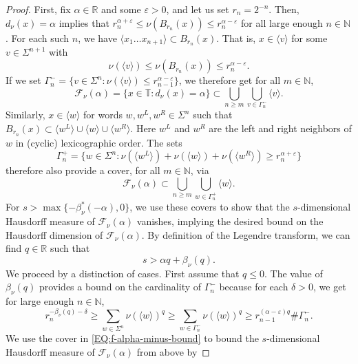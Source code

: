 \documentclass[11pt,reqno]{amsart}
\theoremstyle{plain}
\theoremstyle{definition}
\newcommand{\R}{{\mathbb R}}
\newcommand{\N}{{\mathbb N}}
\newcommand{\mc}{\mathcal}
\begin{document}
\begin{proof}
First, fix $\alpha \in \R$ and some $\varepsilon > 0$, and let us set $r_n = 2^{-n}$. Then, $d_{\nu}(x) = \alpha$ implies that $r_n^{\alpha + \varepsilon}\leqslant \nu(B_{r_n}(x)) \leqslant r_n^{\alpha - \varepsilon}$ for all large enough $n \in \N$. For each such $n$, we have $\langle x_1 \ldots x_{n+1}\rangle \subset B_{r_n}(x)$. That is, $x \in \langle v \rangle$ for some $v \in \Sigma^{n+1}$ with
\[
\nu(\langle v \rangle) \leqslant  \nu(B_{r_n}(x)) \leqslant r_n^{\alpha - \varepsilon}.
\]
If we set $\Gamma_n^{-} = \{ v \in \Sigma^n : \nu(\langle v \rangle) \leqslant r_{n-1}^{\alpha - \varepsilon}  \}$, we therefore get for all $m \in \N$,
\begin{equation}
\label{EQ:f-alpha-minus-bound}
\mc F_{\nu}(\alpha) = \{ x \in \mathbb{T}: d_\nu(x) = \alpha \} \subset \bigcup_{n \geqslant m} \bigcup_{v \in \Gamma_n^{-}} \langle v \rangle.
\end{equation}
Similarly, $x \in \langle w \rangle$ for words $w,w^{L},w^{R} \in \Sigma^n$ such that $B_{r_n}(x) \subset \langle w^L\rangle \cup \langle w \rangle \cup \langle w^{R} \rangle$. Here $w^L$ and $w^R$ are the left and right neighbors of $w$ in (cyclic) lexicographic order. The sets 
\[
\Gamma_n^+ = \{ w \in \Sigma^n :  \nu(\langle w^L \rangle) + \nu(\langle w \rangle) +  \nu(\langle w^R \rangle) \geqslant r_n^{\alpha + \varepsilon} \}
\]
therefore also provide a cover, for all $m \in \N$, via
\begin{equation*}
\mc F_{\nu}(\alpha) \subset \bigcup_{n\geqslant m} \bigcup_{w \in \Gamma_n^+} \langle w \rangle.
\end{equation*}
For $s > \max\{- \beta_{\nu}^{\ast}(-\alpha),0 \}$, we use these covers to show that the $s$-dimensional Hausdorff measure of $\mc F_{\nu}(\alpha)$ vanishes, implying the desired bound on the Hausdorff dimension of $\mc F_{\nu}(\alpha)$. By definition of the Legendre transform, we can find $q \in \R$ such that
\[
s > \alpha q + \beta_\nu(q).
\]
We proceed by a distinction of cases. First assume that $q\leqslant 0$. The value of $\beta_{\nu}(q)$ provides a bound on the cardinality of $\Gamma_n^-$ because for each $\delta > 0$, we get for large enough $n\in \N$,
\[
r_n^{- \beta_\nu(q) - \delta} \geqslant
\sum_{w \in \Sigma^n} \nu(\langle w \rangle)^q 
\geqslant \sum_{w \in \Gamma_n^-} \nu(\langle w \rangle)^q \geqslant r_{n-1}^{(\alpha - \varepsilon) q} \# \Gamma_n^-.
\]
We use the cover in \eqref{EQ:f-alpha-minus-bound} to bound the $s$-dimensional Hausdorff measure of $\mc F_\nu(\alpha)$ from above by

\end{proof}
\end{document}
